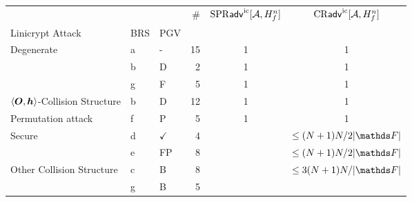 \begin{tabular}{lllrcc}
\toprule
 &  &  & \# & $\mathrm{SPR}\mathsf{adv}^{\mathrm{ic}}[\mathcal{A}, H^n_f]$ & $\mathrm{CR}\mathsf{adv}^{\mathrm{ic}}[\mathcal{A}, H^n_f]$ \\
Linicrypt Attack & BRS & PGV &  &  &  \\
\midrule
\multirow[c]{3}{*}{Degenerate} & a & - & 15 & 1 & 1 \\
\cline{2-6} \cline{3-6}
 & b & D & 2 & 1 & 1 \\
\cline{2-6} \cline{3-6}
 & g & F & 5 & 1 & 1 \\
\cline{1-6} \cline{2-6} \cline{3-6}
$\langle\boldsymbol{O}, \boldsymbol h\rangle$-Collision Structure & b & D & 12 & 1 & 1 \\
\cline{1-6} \cline{2-6} \cline{3-6}
Permutation attack & f & P & 5 & 1 & 1 \\
\cline{1-6} \cline{2-6} \cline{3-6}
\multirow[c]{2}{*}{Secure} & d & $\checkmark$ & 4 &  & $\leq (N+1)N/2|\F|$ \\
\cline{2-6} \cline{3-6}
 & e & FP & 8 &  & $\leq (N+1)N/2|\F|$ \\
\cline{1-6} \cline{2-6} \cline{3-6}
\multirow[c]{2}{*}{Other Collision Structure} & c & B & 8 &  & $\leq 3(N+1)N/|\F|$ \\
\cline{2-6} \cline{3-6}
 & g & B & 5 &  &  \\
\cline{1-6} \cline{2-6} \cline{3-6}
\bottomrule
\end{tabular}
